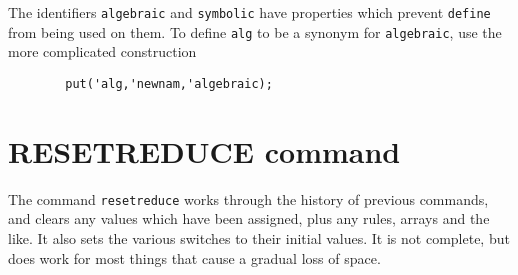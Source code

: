 The identifiers \texttt{algebraic} and \texttt{symbolic} have properties which
prevent \texttt{define} from being used on them.  To define
\texttt{alg} to be a synonym for \texttt{algebraic}, use the more complicated
construction
\begin{verbatim}
        put('alg,'newnam,'algebraic);
\end{verbatim}

\section{RESETREDUCE command}
\hypertarget{command:RESETREDUCE}{}

The command \texttt{resetreduce} works through the                                                                                                                     
history of previous commands, and clears any values which have been
assigned, plus any rules, arrays and the like.  It also sets the various
switches to their initial values.  It is not complete, but does work for
most things that cause a gradual loss of space. 